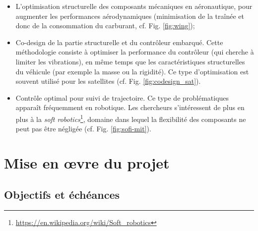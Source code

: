 \documentclass[12pt, french]{article}
\begin{document}
	\begin{itemize}
		\item L'optimisation structurelle des composants mécaniques en aéronautique, pour augmenter les performances aérodynamiques (minimisation de la traînée et donc de la consommation du carburant, cf. Fig. \ref{fig:wing}); 
		\item Co-design de la partie structurelle et du contrôleur embarqué. Cette méthodologie consiste à optimiser la performance du contrôleur (qui cherche à limiter les vibrations), en même temps que les caractéristiques structurelles du véhicule (par exemple la masse ou la rigidité). Ce type d'optimisation est souvent utilisé pour les satellites (cf. Fig. \ref{fig:codesign_sat}).
		\item Contrôle optimal pour suivi de trajectoire. Ce type de problématiques apparaît fréquemment en robotique. Les chercheurs s'intéressent de plus en plus à la \textit{soft robotics}\footnote{\url{https://en.wikipedia.org/wiki/Soft_robotics}}, domaine dans lequel la flexibilité des composants ne peut pas être négligée (cf. Fig. \ref{fig:sofi-mit}).
	\end{itemize}
	
	
	\section{Mise en \oe{}vre du projet}
	
	\subsection{Objectifs et échéances}
	
\end{document}
